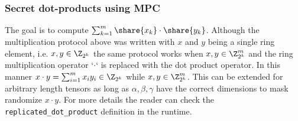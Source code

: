 \subsubsection{Secret dot-products using MPC}

The goal is to compute $\sum_{k=1}^m \share{x_k} \cdot \share{y_k}$. Although
the multiplication protocol above was written with $x$ and $y$ being a single
ring element, i.e. $x,y \in \Z_{2^k}$ the same protocol works when $x, y \in
\Z^m_{2^k}$ and the ring multiplication operator `$\cdot$` is replaced with
the dot product operator. In this manner $x \cdot y = \sum_{i=1}^m x_i y_i \in
\Z_{2^k}$ while $x, y \in \Z^m_{2^k}$. This can be extended for arbitrary
length tensors as long as $\alpha, \beta, \gamma$ have the correct dimensions
to mask randomize $x \cdot y$. For more details the reader can check the
\verb|replicated_dot_product| definition in the runtime.




